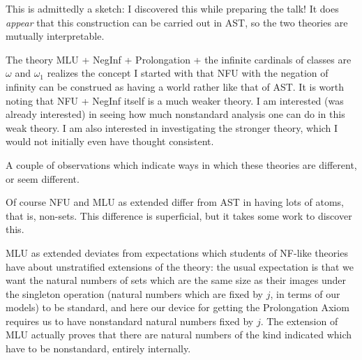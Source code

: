 \documentclass{slides}
\begin{document}
\begin{slide}

This is admittedly a sketch:  I discovered this while preparing the talk!  It does {\em appear\/} that this construction can be carried out in AST, so the two theories are mutually interpretable.

The theory MLU + NegInf + Prolongation + the infinite cardinals of classes are $\omega$ and $\omega_1$  realizes the concept I started with that NFU with the negation of infinity can be construed as having a world rather like that of AST.   It is worth noting that NFU + NegInf itself is a much weaker theory.  I am interested (was already interested) in seeing how much nonstandard analysis one can do in this weak theory.  I am also interested in investigating the stronger theory, which I would not initially even have thought consistent.

\end{slide}

\begin{slide}

A couple of observations which indicate ways in which these theories are different, or seem different.

Of course NFU and MLU as extended differ from AST in having lots of atoms, that is, non-sets.  This difference is superficial, but it takes some work to discover this.

MLU as extended deviates from expectations which students of NF-like theories have about unstratified extensions of the theory:  the usual expectation is that we want the natural numbers of sets which are the same size as their images under the singleton operation (natural numbers which are fixed by $j$, in terms of our models) to be standard, and here our device for getting the Prolongation Axiom requires us to have nonstandard natural numbers fixed by $j$.  The extension of MLU actually proves that there are natural numbers of the kind indicated which have to be nonstandard, entirely internally.

\end{slide}
\end{document}

